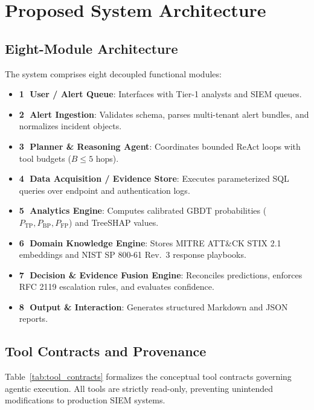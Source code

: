\section{Proposed System Architecture}

\subsection{Eight-Module Architecture}
The system comprises eight decoupled functional modules:
\begin{itemize}
    \item \textbf{\textcircled{1} User / Alert Queue}: Interfaces with Tier-1 analysts and SIEM queues.
    \item \textbf{\textcircled{2} Alert Ingestion}: Validates schema, parses multi-tenant alert bundles, and normalizes incident objects.
    \item \textbf{\textcircled{3} Planner \& Reasoning Agent}: Coordinates bounded ReAct loops with tool budgets ($B \le 5$ hops).
    \item \textbf{\textcircled{4} Data Acquisition / Evidence Store}: Executes parameterized SQL queries over endpoint and authentication logs.
    \item \textbf{\textcircled{5} Analytics Engine}: Computes calibrated GBDT probabilities ($P_{\text{TP}}, P_{\text{BP}}, P_{\text{FP}}$) and TreeSHAP values.
    \item \textbf{\textcircled{6} Domain Knowledge Engine}: Stores MITRE ATT\&CK STIX 2.1 embeddings and NIST SP 800-61 Rev.~3 response playbooks.
    \item \textbf{\textcircled{7} Decision \& Evidence Fusion Engine}: Reconciles predictions, enforces RFC 2119 escalation rules, and evaluates confidence.
    \item \textbf{\textcircled{8} Output \& Interaction}: Generates structured Markdown and JSON reports.
\end{itemize}

\subsection{Tool Contracts and Provenance}
Table~\ref{tab:tool_contracts} formalizes the conceptual tool contracts governing agentic execution. All tools are strictly read-only, preventing unintended modifications to production SIEM systems.

